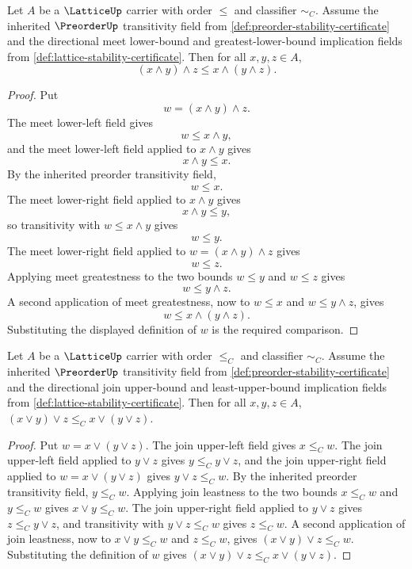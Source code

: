 \begin{lemma}
\label{lem:lattice-directed-meet-associativity-comparison-from-bounds}
Let $A$ be a $\LatticeUp$ carrier with order $\le$ and classifier $\sim_C$. Assume the inherited $\PreorderUp$ transitivity field from \autoref{def:preorder-stability-certificate} and the directional meet lower-bound and greatest-lower-bound implication fields from \autoref{def:lattice-stability-certificate}. Then for all $x,y,z\in A$,
$$
(x\wedge y)\wedge z\le x\wedge(y\wedge z).
$$
\end{lemma}
\begin{proof}
Put
$$
w=(x\wedge y)\wedge z.
$$
The meet lower-left field gives
$$
w\le x\wedge y,
$$
and the meet lower-left field applied to $x\wedge y$ gives
$$
x\wedge y\le x.
$$
By the inherited preorder transitivity field,
$$
w\le x.
$$
The meet lower-right field applied to $x\wedge y$ gives
$$
x\wedge y\le y,
$$
so transitivity with $w\le x\wedge y$ gives
$$
w\le y.
$$
The meet lower-right field applied to $w=(x\wedge y)\wedge z$ gives
$$
w\le z.
$$
Applying meet greatestness to the two bounds $w\le y$ and $w\le z$ gives
$$
w\le y\wedge z.
$$
A second application of meet greatestness, now to $w\le x$ and $w\le y\wedge z$, gives
$$
w\le x\wedge(y\wedge z).
$$
Substituting the displayed definition of $w$ is the required comparison.
\end{proof}

\begin{lemma}\label{lem:lattice-directed-join-associativity-comparison-from-bounds} Let $A$ be a $\LatticeUp$ carrier with order $\le_C$ and classifier $\sim_C$. Assume the inherited $\PreorderUp$ transitivity field from \autoref{def:preorder-stability-certificate} and the directional join upper-bound and least-upper-bound implication fields from \autoref{def:lattice-stability-certificate}. Then for all $x,y,z\in A$, $(x\vee y)\vee z\le_C x\vee(y\vee z)$.
\end{lemma}
\begin{proof} Put $w=x\vee(y\vee z)$. The join upper-left field gives $x\le_C w$. The join upper-left field applied to $y\vee z$ gives $y\le_C y\vee z$, and the join upper-right field applied to $w=x\vee(y\vee z)$ gives $y\vee z\le_C w$. By the inherited preorder transitivity field, $y\le_C w$. Applying join leastness to the two bounds $x\le_C w$ and $y\le_C w$ gives $x\vee y\le_C w$. The join upper-right field applied to $y\vee z$ gives $z\le_C y\vee z$, and transitivity with $y\vee z\le_C w$ gives $z\le_C w$. A second application of join leastness, now to $x\vee y\le_C w$ and $z\le_C w$, gives $(x\vee y)\vee z\le_C w$. Substituting the definition of $w$ gives $(x\vee y)\vee z\le_C x\vee(y\vee z)$.
\end{proof}

